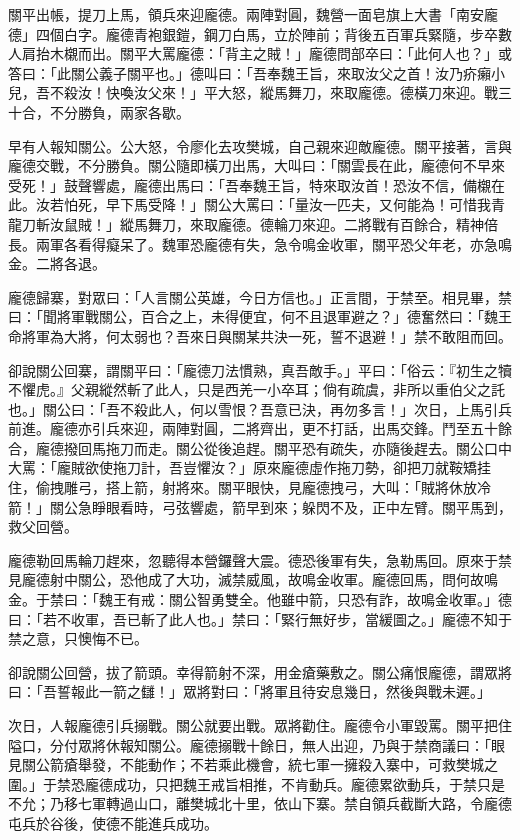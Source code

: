 關平出帳，提刀上馬，領兵來迎龐德。兩陣對圓，魏營一面皂旗上大書「南安龐德」四個白字。龐德青袍銀鎧，鋼刀白馬，立於陣前；背後五百軍兵緊隨，步卒數人肩抬木櫬而出。關平大罵龐德：「背主之賊！」龐德問部卒曰：「此何人也？」或答曰：「此關公義子關平也。」德叫曰：「吾奉魏王旨，來取汝父之首！汝乃疥癩小兒，吾不殺汝！快喚汝父來！」平大怒，縱馬舞刀，來取龐德。德橫刀來迎。戰三十合，不分勝負，兩家各歇。

早有人報知關公。公大怒，令廖化去攻樊城，自己親來迎敵龐德。關平接著，言與龐德交戰，不分勝負。關公隨即橫刀出馬，大叫曰：「關雲長在此，龐德何不早來受死！」鼓聲響處，龐德出馬曰：「吾奉魏王旨，特來取汝首！恐汝不信，備櫬在此。汝若怕死，早下馬受降！」關公大罵曰：「量汝一匹夫，又何能為！可惜我青龍刀斬汝鼠賊！」縱馬舞刀，來取龐德。德輪刀來迎。二將戰有百餘合，精神倍長。兩軍各看得癡呆了。魏軍恐龐德有失，急令鳴金收軍，關平恐父年老，亦急鳴金。二將各退。

龐德歸寨，對眾曰：「人言關公英雄，今日方信也。」正言間，于禁至。相見畢，禁曰：「聞將軍戰關公，百合之上，未得便宜，何不且退軍避之？」德奮然曰：「魏王命將軍為大將，何太弱也？吾來日與關某共決一死，誓不退避！」禁不敢阻而回。

卻說關公回寨，謂關平曰：「龐德刀法慣熟，真吾敵手。」平曰：「俗云：『初生之犢不懼虎。』父親縱然斬了此人，只是西羌一小卒耳；倘有疏虞，非所以重伯父之託也。」關公曰：「吾不殺此人，何以雪恨？吾意已決，再勿多言！」次日，上馬引兵前進。龐德亦引兵來迎，兩陣對圓，二將齊出，更不打話，出馬交鋒。鬥至五十餘合，龐德撥回馬拖刀而走。關公從後追趕。關平恐有疏失，亦隨後趕去。關公口中大罵：「龐賊欲使拖刀計，吾豈懼汝？」原來龐德虛作拖刀勢，卻把刀就鞍矯挂住，偷拽雕弓，搭上箭，射將來。關平眼快，見龐德拽弓，大叫：「賊將休放冷箭！」關公急睜眼看時，弓弦響處，箭早到來；躲閃不及，正中左臂。關平馬到，救父回營。

龐德勒回馬輪刀趕來，忽聽得本營鑼聲大震。德恐後軍有失，急勒馬回。原來于禁見龐德射中關公，恐他成了大功，滅禁威風，故鳴金收軍。龐德回馬，問何故鳴金。于禁曰：「魏王有戒：關公智勇雙全。他雖中箭，只恐有詐，故鳴金收軍。」德曰：「若不收軍，吾已斬了此人也。」禁曰：「緊行無好步，當緩圖之。」龐德不知于禁之意，只懊悔不已。

卻說關公回營，拔了箭頭。幸得箭射不深，用金瘡藥敷之。關公痛恨龐德，謂眾將曰：「吾誓報此一箭之讎！」眾將對曰：「將軍且待安息幾日，然後與戰未遲。」

次日，人報龐德引兵搦戰。關公就要出戰。眾將勸住。龐德令小軍毀罵。關平把住隘口，分付眾將休報知關公。龐德搦戰十餘日，無人出迎，乃與于禁商議曰：「眼見關公箭瘡舉發，不能動作；不若乘此機會，統七軍一擁殺入寨中，可救樊城之圍。」于禁恐龐德成功，只把魏王戒旨相推，不肯動兵。龐德累欲動兵，于禁只是不允；乃移七軍轉過山口，離樊城北十里，依山下寨。禁自領兵截斷大路，令龐德屯兵於谷後，使德不能進兵成功。

